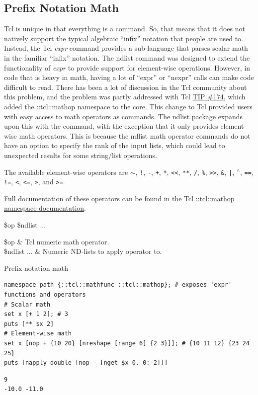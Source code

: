 \clearpage
\subsection{Prefix Notation Math}
Tcl is unique in that everything is a command. So, that means that it does not natively support the typical algebraic ``infix'' notation that people are used to. 
Instead, the Tcl \textit{expr} command provides a sub-language that parses scalar math in the familiar ``infix'' notation.
The ndlist  command was designed to extend the functionality of \textit{expr} to provide support for element-wise operations. 
However, in code that is heavy in math, having a lot of ``expr'' or ``nexpr'' calls can make code difficult to read.
There has been a lot of discussion in the Tcl community about this problem, and the problem was partly addressed with Tcl \hyperlink{https://core.tcl-lang.org/tips/doc/trunk/tip/174.md}{TIP \#174}, which added the ::tcl::mathop namespace to the core. 
This change to Tcl provided users with easy access to math operators as commands.
The ndlist package expands upon this with the  command, with the exception that it only provides element-wise math operators. 
This is because the ndlist math operator commands do not have an option to specify the rank of the input lists, which could lead to unexpected results for some string/list operations.

The available element-wise operators are \texttt{$\sim$}, \texttt{!}, \texttt{-}, \texttt{+}, \texttt{*}, \texttt{<{}<}, \texttt{**}, \texttt{/}, \texttt{\%}, \texttt{>{}>}, \texttt{\&}, \texttt{|}, \texttt{$^\wedge$}, \texttt{==}, \texttt{!=}, \texttt{<}, \texttt{<=}, \texttt{>}, and \texttt{>=}. 

Full documentation of these operators can be found in the Tcl \hyperlink{https://www.tcl-lang.org/man/tcl/TclCmd/mathop.htm}{::tcl::mathop namespace documentation}.

\begin{syntax}
 \$op \$ndlist ...
\end{syntax}
\begin{args}
\$op & Tcl numeric math operator. \\
\$ndlist ... & Numeric ND-lists to apply operator to.
\end{args}

\begin{example}{Prefix notation math}
\begin{lstlisting}
namespace path {::tcl::mathfunc ::tcl::mathop}; # exposes 'expr' functions and operators
# Scalar math
set x [+ 1 2]; # 3
puts [** $x 2]
# Element-wise math
set x [nop + {10 20} [nreshape [range 6] {2 3}]]; # {10 11 12} {23 24 25}
puts [napply double [nop - [nget $x 0. 0:-2]]]
\end{lstlisting}
\tcblower
\begin{lstlisting}
9
-10.0 -11.0
\end{lstlisting}
\end{example}

\clearpage